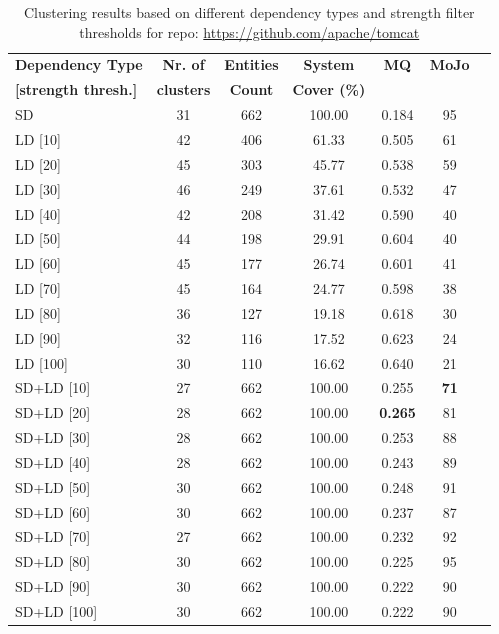 \documentclass{ieeeaccess}
\begin{document}
\begin{table}
\caption{Clustering results based on different dependency types and strength filter thresholds for repo: \href{https://github.com/apache/tomcat}{https://github.com/apache/tomcat}}
\label{tab:clustering_results_tomcat}
\centering
\setlength{\tabcolsep}{3pt}
\begin{tabular}{|l|c|c|c|c|c|c|}
\hline
\textbf{Dependency Type} & \textbf{Nr. of} & \textbf{Entities} & \textbf{System} & \textbf{MQ} & \textbf{MoJo} \\
\textbf{[strength thresh.]} & \textbf{clusters} & \textbf{Count} & \textbf{Cover (\%)} &  &  \\
\hline
SD & 31 & 662 & 100.00 & 0.184 & 95 \\
\hline
LD [10] & 42 & 406 & 61.33 & 0.505 & 61 \\
LD [20] & 45 & 303 & 45.77 & 0.538 & 59 \\
LD [30] & 46 & 249 & 37.61 & 0.532 & 47 \\
LD [40] & 42 & 208 & 31.42 & 0.590 & 40 \\
LD [50] & 44 & 198 & 29.91 & 0.604 & 40 \\
LD [60] & 45 & 177 & 26.74 & 0.601 & 41 \\
LD [70] & 45 & 164 & 24.77 & 0.598 & 38 \\
LD [80] & 36 & 127 & 19.18 & 0.618 & 30 \\
LD [90] & 32 & 116 & 17.52 & 0.623 & 24 \\
LD [100] & 30 & 110 & 16.62 & 0.640 & 21 \\
\hline
SD+LD [10] & 27 & 662 & 100.00 & 0.255 &  \cellcolor[HTML]{C0C0C0}\textbf{71} \\
SD+LD [20] & 28 & 662 & 100.00 &  \cellcolor[HTML]{C0C0C0}\textbf{0.265} & 81 \\
SD+LD [30] & 28 & 662 & 100.00 & 0.253 & 88 \\
SD+LD [40] & 28 & 662 & 100.00 & 0.243 & 89 \\
SD+LD [50] & 30 & 662 & 100.00 & 0.248 & 91 \\
SD+LD [60] & 30 & 662 & 100.00 & 0.237 & 87 \\
SD+LD [70] & 27 & 662 & 100.00 & 0.232 & 92 \\
SD+LD [80] & 30 & 662 & 100.00 & 0.225 & 95 \\
SD+LD [90] & 30 & 662 & 100.00 & 0.222 & 90 \\
SD+LD [100] & 30 & 662 & 100.00 & 0.222 & 90 \\
\hline
\end{tabular}
\end{table}
\end{document}
